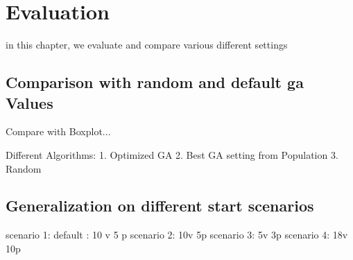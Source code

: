 \chapter{Evaluation}
\label{chap:evaluation}
in this chapter, we evaluate and compare various different settings



\section{Comparison with random and default ga Values}

Compare with Boxplot...

Different Algorithms:
1. Optimized GA
2. Best GA setting from Population
3. Random



\section{Generalization on different start scenarios}

scenario 1: default : 10 v 5 p
scenario 2: 10v 5p
scenario 3: 5v 3p
scenario 4: 18v 10p
